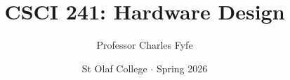 \documentclass{article}
\title{CSCI 241: Hardware Design}
\author{Professor Charles Fyfe}
\date{St Olaf College $\cdot$ Spring 2026}
\begin{document}
\setcounter{secnumdepth}{1}

\maketitle
\setcounter{tocdepth}{2}
\tableofcontents

\newpage







\begin{appendices}



\end{appendices}
\end{document}
